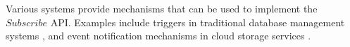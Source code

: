 Various systems provide mechanisms that can be used to implement the $Subscribe$ API.
Examples include triggers in traditional database management systems \cite{mariadb:triggers}, and event notification
mechanisms in cloud storage services \cite{awss3:notifications}.



















